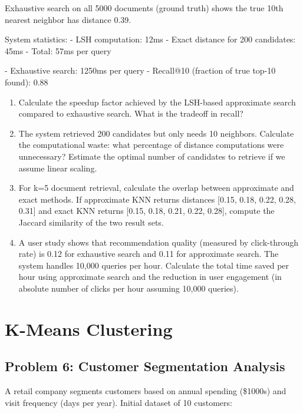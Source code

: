 \documentclass[12pt]{article}
\begin{document}
Exhaustive search on all 5000 documents (ground truth) shows the true 10th nearest neighbor has distance 0.39.

System statistics:
- LSH computation: 12ms
- Exact distance for 200 candidates: 45ms
- Total: 57ms per query

- Exhaustive search: 1250ms per query
- Recall@10 (fraction of true top-10 found): 0.88

\begin{enumerate}[label=(\alph*)]
\item Calculate the speedup factor achieved by the LSH-based approximate search compared to exhaustive search. What is the tradeoff in recall?

\item The system retrieved 200 candidates but only needs 10 neighbors. Calculate the computational waste: what percentage of distance computations were unnecessary? Estimate the optimal number of candidates to retrieve if we assume linear scaling.

\item For k=5 document retrieval, calculate the overlap between approximate and exact methods. If approximate KNN returns distances [0.15, 0.18, 0.22, 0.28, 0.31] and exact KNN returns [0.15, 0.18, 0.21, 0.22, 0.28], compute the Jaccard similarity of the two result sets.

\item A user study shows that recommendation quality (measured by click-through rate) is 0.12 for exhaustive search and 0.11 for approximate search. The system handles 10,000 queries per hour. Calculate the total time saved per hour using approximate search and the reduction in user engagement (in absolute number of clicks per hour assuming 10,000 queries).
\end{enumerate}


\section{K-Means Clustering}

\subsection*{Problem 6: Customer Segmentation Analysis}

A retail company segments customers based on annual spending (\$1000s) and visit frequency (days per year). Initial dataset of 10 customers:
\end{document}

